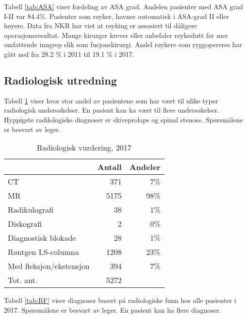 Tabell \ref{tab:ASA} viser fordeling av ASA grad. Andelen pasienter med ASA grad I-II 
var 84.4\%. Pasienter som røyker, havner 
automatisk i ASA-grad II eller høyere. Data fra NKR har vist at røyking er assosiert til dåligere operasjonsresultat.
Mange kirurger krever eller anbefaler røykeslutt før mer omfattende inngrep slik som fusjonskirurgi.
Andel røykere som ryggopereres har gått ned fra 28.2 \% i 2011 til 19.1 \% i 2017. 



\subsection{Radiologisk utredning}

Tabell \ref{tab:RV} viser hvor stor andel av pasientene som har vært til ulike typer 
radiologisk undersøkelser. En pasient kan ha vært til flere undersøkelser. Hyppigste radilologiske diagnoser er skiveprolaps og spinal stenose.
Spørsmålene er besvart av leger. 

\begin{table}[ht]
\centering
\begin{tabular}{lrr}
  \hline
 & Antall & Andeler \\ 
  \hline
CT & 371 & 7\% \\ 
  MR & 5175 & 98\% \\ 
  Radikulografi & 38 & 1\% \\ 
  Diskografi & 2 & 0\% \\ 
  Diagnostisk blokade & 28 & 1\% \\ 
  Røntgen LS-columna & 1208 & 23\% \\ 
  Med fleksjon/ekstensjon & 394 & 7\% \\ 
  Tot. ant. & 5272 &   \\ 
   \hline
\end{tabular}
\caption{Radiologisk vurdering, 2017} 
\label{tab:RV}
\end{table}




Tabell \ref{tab:RF} viser diagnoser basert på radiologiske funn hos alle pasienter 
i 2017. 
Spørsmålene er besvart av leger.
En pasient kan ha flere diagnoser.


